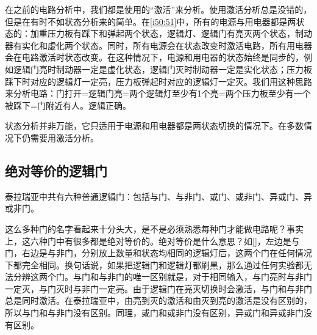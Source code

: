 \begin{figure}[!h]
\begin{center}
\end{center}
\caption{}
\label{i50:51}
\end{figure}

在之前的电路分析中，我们都是使用的“激活”来分析。使用激活分析总是没错的，但是在有时不如状态分析来的简单。在\autoref{i50:51}中，所有的电源与用电器都是两状态的：加重压力板有踩下和弹起两个状态，逻辑灯、逻辑门有亮灭两个状态，制动器有实化和虚化两个状态。同时，所有电源会在状态改变时激活电路，所有用电器会在电路激活时状态改变。在这种情况下，电源和用电器的状态始终是同步的，例如逻辑门亮时制动器一定是虚化状态，逻辑门灭时制动器一定是实化状态；压力板踩下时对应的逻辑灯一定亮，压力板弹起时对应的逻辑灯一定灭。我们用这种思路来分析电路：门打开=逻辑门亮=两个逻辑灯至少有1个亮=两个压力板至少有一个被踩下=门附近有人。逻辑正确。

状态分析并非万能，它只适用于电源和用电器都是两状态切换的情况下。在多数情况下仍需要用激活分析。

\subsection{绝对等价的逻辑门}
泰拉瑞亚中共有六种普通逻辑门：包括与门、与非门、或门、或非门、异或门、异或非门。

这么多种门的名字看起来十分头大，是不是必须熟悉每种门才能做电路呢？事实上，这六种门中有很多都是绝对等价的。绝对等价是什么意思？如\autoref{}，左边是与门，右边是与非门，分别放上数量和状态均相同的逻辑灯后，这两个门在任何情况下都完全相同。换句话说，如果把逻辑门和逻辑灯都刷黑，那么通过任何实验都无法分辨这两个门。与门和与非门的唯一区别就是，对于相同输入，与门亮时与非门一定灭，与门灭时与非门一定亮。由于逻辑门在亮灭切换时会激活，与门和与非门总是同时激活。在泰拉瑞亚中，由亮到灭的激活和由灭到亮的激活是没有区别的，所以与门和与非门没有区别。同理，或门和或非门没有区别，异或门和异或非门没有区别。

